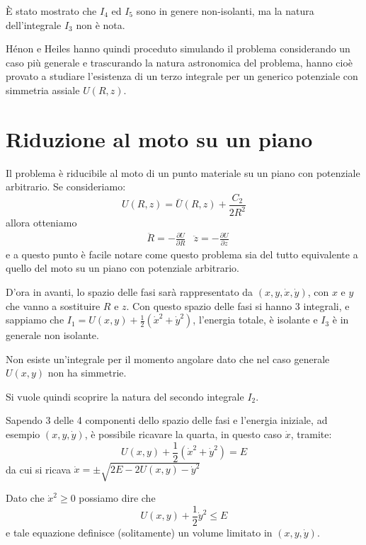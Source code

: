 \documentclass[a4paper]{article}
\numberwithin{equation}{section}
\numberwithin{figure}{section}
\begin{document}
È stato mostrato che $I_4$ ed $I_5$ sono in genere non-isolanti, ma la natura dell'integrale
$I_3$ non è nota.

Hénon e Heiles hanno quindi proceduto simulando il problema considerando un caso più generale
e trascurando la natura astronomica del problema, hanno cioè provato a studiare l'esistenza
di un terzo integrale per un generico potenziale con simmetria assiale $U(R,z)$.

\clearpage

\section{Riduzione al moto su un piano}
Il problema è riducibile al moto di un punto materiale su un piano con potenziale arbitrario.
Se consideriamo:
\begin{equation}
	U(R,z) = \bar{U}(R,z) + \frac{C_2}{2R^2}
\end{equation}
allora otteniamo
\begin{align}
	&\ddot{R} = -\frac{\partial U}{\partial R}&
	\ddot{z} = -\frac{\partial U}{\partial z}
\end{align}
e a questo punto è facile notare come questo problema sia del tutto equivalente a quello del moto su un piano
con potenziale arbitrario.

D'ora in avanti, lo spazio delle fasi sarà rappresentato da $(x,y,\dot{x},\dot{y})$,
con $x$ e $y$ che vanno a sostituire $R$ e $z$. Con questo spazio delle fasi si hanno 3 integrali,
e sappiamo che $I_1 = U(x,y)+\frac{1}{2}(\dot{x}^2+\dot{y}^2)$, l'energia totale, è isolante e $I_3$ è
in generale non isolante.

Non esiste un'integrale per il momento angolare dato che nel caso generale $U(x,y)$ non ha
simmetrie.

Si vuole quindi scoprire la natura del secondo integrale $I_2$.

Sapendo 3 delle 4 componenti dello spazio delle fasi e l'energia iniziale, ad esempio $(x,y,\dot{y})$,
è possibile ricavare la quarta, in questo caso $\dot{x}$, tramite:
\begin{equation}
	U(x,y)+\frac{1}{2}(\dot{x}^2+\dot{y}^2) = E \label{eq:consenergiaxy}
\end{equation}
da cui si ricava $\dot{x} = \pm \sqrt{2E-2U(x,y)-\dot{y}^2}$

Dato che $\dot{x}^2 \ge 0$ possiamo dire che
\begin{equation}
	U(x,y)+\frac{1}{2}\dot{y}^2 \le E
\end{equation}
e tale equazione definisce (solitamente) un volume limitato in $(x,y,\dot{y})$.
\end{document}
